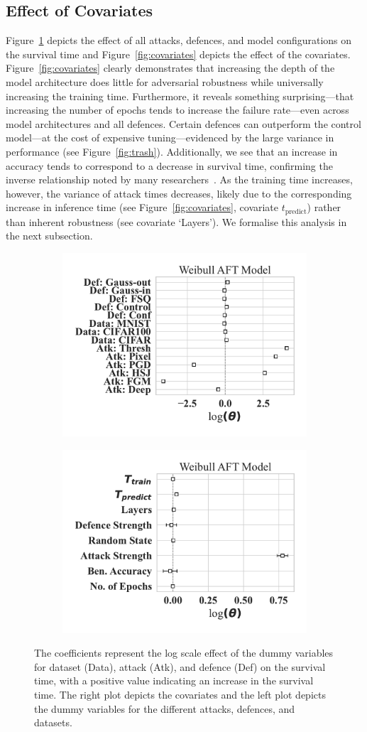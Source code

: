 \subsection{Effect of Covariates}
Figure~\ref{fig:dummies} depicts the effect of all attacks, defences, and model configurations on the survival time and Figure~\ref{fig:covariates} depicts the effect of the covariates.
Figure~\ref{fig:covariates} clearly demonstrates that increasing the depth of the model architecture does little for adversarial robustness while universally increasing the training time.
Furthermore, it reveals something surprising---that increasing the number of epochs tends to increase the failure rate---even across model architectures and all defences.
Certain defences can outperform the control model---at the cost of expensive tuning---evidenced by the large variance in performance (see Figure~\ref{fig:trash}).
Additionally, we see that an increase in accuracy tends to correspond to a decrease in survival time, confirming the inverse relationship noted by many researchers~\cite{carlini_towards_2017,biggio_evasion_2013,meyers}.
As the training time increases, however, the variance of attack times decreases, likely due to the corresponding increase in inference time (see Figure~\ref{fig:covariates}, covariate $t_{\mathrm{predict}}$) rather than inherent robustness (see covariate `Layers').
We formalise this analysis in the next subsection.

\begin{figure}
    \centering
	\begin{subfigure}
	\centering
    \includegraphics[width=.32\textwidth]{plots/weibull_aft_dummies.pdf}
    \end{subfigure}
    \begin{subfigure}
	\centering
    \includegraphics[width=.32\textwidth]{plots/weibull_aft.pdf}
    \end{subfigure}
    \caption{The coefficients represent the log scale effect of the dummy variables for dataset (Data), attack (Atk), and defence (Def) on the survival time, with a positive value indicating an increase in the survival time. The right plot depicts the covariates and the left plot depicts the dummy variables for the different attacks, defences, and datasets.}
    \label{fig:covariates}
    \label{fig:dummies}
\end{figure}

